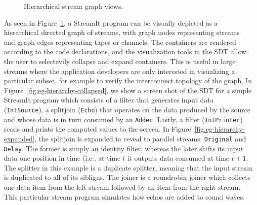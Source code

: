 \documentclass[11pt, letterpaper, onecolumn]{article}
\begin{document}
\begin{figure}[t]
\begin{center}
{    
  }
  \caption{Hierarchical stream graph views.}
  \label{fig:hierarchy}
\end{center}
\end{figure}

As  seen  in Figure~\ref{fig:hierarchy},  a  StreamIt  program can  be
visually depicted  as a hierarchical  directed graph of  streams, with
graph nodes representing streams and graph edges representing tapes or
channels.   The   containers  are  rendered  according   to  the  code
declarations, and the visualization tools in the SDT allow the user to
selectevily collapse  and expand containers.  This is  useful in large
streams  where  the  application  developers are  only  interested  in
visualizing   a  particular   subset,  for   example  to   verify  the
interconnect       topology        of       the       graph.        In
Figure~\ref{fig:eg-hierarchy-collapsed}, we show  a screen shot of the
SDT  for a simple  StreamIt program  which consists  of a  filter that
generates input data (\texttt{IntSource}), a splitjoin (\texttt{Echo})
that operates on the data produced  by the source and whose data is in
turn    consumed   by   an    \texttt{Adder}.    Lastly,    a   filter
(\texttt{IntPrinter})  reads and  prints  the computed  values to  the
screen.   In Figure~\ref{fig:eg-hierarchy-expanded}, the  splitjoin is
expanded  to   reveal  to  parallel   streams:  \texttt{Original}  and
\texttt{Delay}. The  former is simply an identity  filter, whereas the
later shifts its input data one position in time (i.e., at time $t$ it
outputs data consumed at time $t+1$. The splitter in this example is a
duplicate splitter, meaning that the input stream is duplicated to all
of its sibligns. The joiner  is a roundrobin joiner which collects one
data item  from the  left stream  followed by an  item from  the right
stream. This particular stream program simulates how echos are added
to sound waves.
\end{document}
